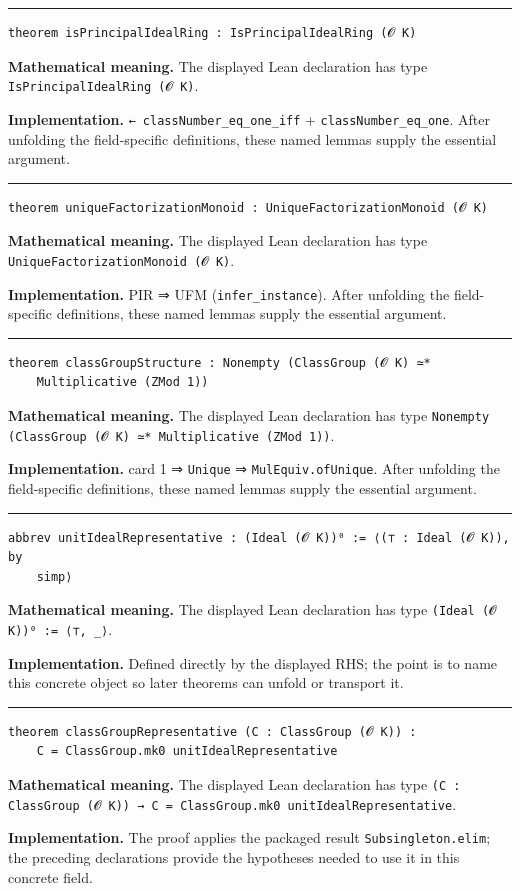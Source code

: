 \documentclass[UTF8,a4paper,11pt,fontset=fandol]{ctexart}
\theoremstyle{definition}
\newcommand{\statementsep}{\par\medskip\hrule\medskip}
\begin{document}
\statementsep
\begin{verbatim}
theorem isPrincipalIdealRing : IsPrincipalIdealRing (𝓞 K)
\end{verbatim}
\noindent\textbf{Mathematical meaning.} The displayed Lean declaration has type \texttt{IsPrincipalIdealRing (𝓞 K)}.\par
\noindent\textbf{Implementation.} \texttt{← classNumber\_\allowbreak{}eq\_\allowbreak{}one\_\allowbreak{}iff} + \texttt{classNumber\_\allowbreak{}eq\_\allowbreak{}one}. After unfolding the field-specific definitions, these named lemmas supply the essential argument.\par
\statementsep
\begin{verbatim}
theorem uniqueFactorizationMonoid : UniqueFactorizationMonoid (𝓞 K)
\end{verbatim}
\noindent\textbf{Mathematical meaning.} The displayed Lean declaration has type \texttt{UniqueFactorizationMonoid (𝓞 K)}.\par
\noindent\textbf{Implementation.} PIR ⇒ UFM (\texttt{infer\_\allowbreak{}instance}). After unfolding the field-specific definitions, these named lemmas supply the essential argument.\par
\statementsep
\begin{verbatim}
theorem classGroupStructure : Nonempty (ClassGroup (𝓞 K) ≃*
    Multiplicative (ZMod 1))
\end{verbatim}
\noindent\textbf{Mathematical meaning.} The displayed Lean declaration has type \texttt{Nonempty (ClassGroup (𝓞 K) ≃* Multiplicative (ZMod 1))}.\par
\noindent\textbf{Implementation.} card 1 ⇒ \texttt{Unique} ⇒ \texttt{MulEquiv.\allowbreak{}ofUnique}. After unfolding the field-specific definitions, these named lemmas supply the essential argument.\par
\statementsep
\begin{verbatim}
abbrev unitIdealRepresentative : (Ideal (𝓞 K))⁰ := ⟨(⊤ : Ideal (𝓞 K)), by
    simp⟩
\end{verbatim}
\noindent\textbf{Mathematical meaning.} The displayed Lean declaration has type \texttt{(Ideal (𝓞 K))⁰ := ⟨⊤, \_\allowbreak{}⟩}.\par
\noindent\textbf{Implementation.} Defined directly by the displayed RHS; the point is to name this concrete object so later theorems can unfold or transport it.\par
\statementsep
\begin{verbatim}
theorem classGroupRepresentative (C : ClassGroup (𝓞 K)) :
    C = ClassGroup.mk0 unitIdealRepresentative
\end{verbatim}
\noindent\textbf{Mathematical meaning.} The displayed Lean declaration has type \texttt{(C : ClassGroup (𝓞 K)) → C = ClassGroup.\allowbreak{}mk0 unitIdealRepresentative}.\par
\noindent\textbf{Implementation.} The proof applies the packaged result \texttt{Subsingleton.\allowbreak{}elim}; the preceding declarations provide the hypotheses needed to use it in this concrete field.\par
\end{document}
